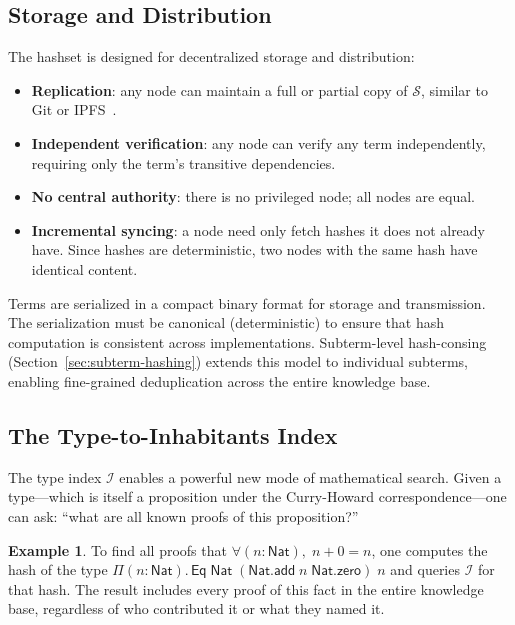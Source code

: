 \documentclass[11pt]{article}
\theoremstyle{definition}
\newtheorem{example}{Example}[section]
\theoremstyle{plain}
\theoremstyle{remark}
\newcommand{\hashset}{\mathcal{S}}
\newcommand{\typeindex}{\mathcal{I}}
\newcommand{\Nat}{\textsf{Nat}}
\newcommand{\Eq}{\textsf{Eq}}
\begin{document}
\subsection{Storage and Distribution}
\label{sec:distribution}

The hashset is designed for decentralized storage and distribution:
\begin{itemize}[nosep]
  \item \textbf{Replication}: any node can maintain a full or partial copy of $\hashset$,
    similar to Git or IPFS~\cite{ipfs}.
  \item \textbf{Independent verification}: any node can verify any term independently,
    requiring only the term's transitive dependencies.
  \item \textbf{No central authority}: there is no privileged node; all nodes are equal.
  \item \textbf{Incremental syncing}: a node need only fetch hashes it does not already have.
    Since hashes are deterministic, two nodes with the same hash have identical content.
\end{itemize}

Terms are serialized in a compact binary format for storage and transmission.
The serialization must be canonical (deterministic) to ensure that hash computation is consistent
across implementations.
Subterm-level hash-consing (Section~\ref{sec:subterm-hashing}) extends this model
to individual subterms, enabling fine-grained deduplication across the entire knowledge base.

\subsection{The Type-to-Inhabitants Index}
\label{sec:type-index}

The type index $\typeindex$ enables a powerful new mode of mathematical search.
Given a type---which is itself a proposition under the Curry-Howard correspondence---one can
ask: ``what are all known proofs of this proposition?''

\begin{example}
To find all proofs that $\forall (n : \Nat),\; n + 0 = n$, one computes the hash
of the type $\Pi(n{:}\Nat).\,\Eq\;\Nat\;(\Nat.\textsf{add}\;n\;\Nat.\textsf{zero})\;n$ and queries
$\typeindex$ for that hash.
The result includes every proof of this fact in the entire knowledge base, regardless of who
contributed it or what they named it.
\end{example}
\end{document}
